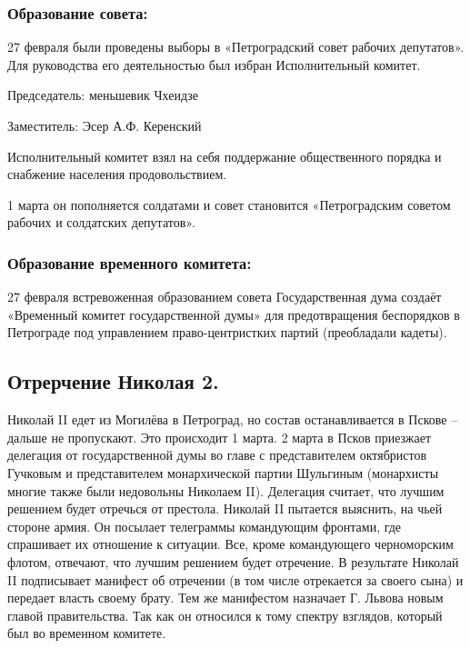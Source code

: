 \subsubsection{\textbf{Образование совета:}}

27 февраля были проведены выборы в «Петроградский совет рабочих депутатов». Для руководства его деятельностью был избран Исполнительный комитет.

Председатель: меньшевик Чхеидзе

Заместитель: Эсер А.Ф. Керенский

Исполнительный комитет взял на себя поддержание общественного порядка и снабжение населения продовольствием.

1 марта он пополняется солдатами и совет становится «Петроградским советом рабочих и солдатских депутатов».

\subsubsection{\textbf{Образование временного комитета:}}

27 февраля встревоженная образованием совета Государственная дума создаёт «Временный комитет государственной думы» для предотвращения беспорядков в Петрограде под управлением право-центристких партий (преобладали кадеты). 

\subsection{Отрерчение Николая 2.}

Николай II едет из Могилёва в Петроград, но состав останавливается в Пскове – дальше не пропускают. Это происходит 1 марта. 2 марта в Псков приезжает делегация от государственной думы во главе с представителем октябристов Гучковым и представителем монархической партии Шульгиным (монархисты многие также были недовольны Николаем II). Делегация считает, что лучшим решением будет отречься от престола. Николай II пытается выяснить, на чьей стороне армия. Он посылает телеграммы командующим фронтами, где спрашивает их отношение к ситуации. Все, кроме командующего черноморским флотом, отвечают, что лучшим решением будет отречение. В результате Николай II подписывает манифест об отречении (в том числе отрекается за своего сына) и передает власть своему брату. Тем же манифестом назначает Г. Львова новым главой правительства. Так как он относился к тому спектру взглядов, который был во временном комитете.
